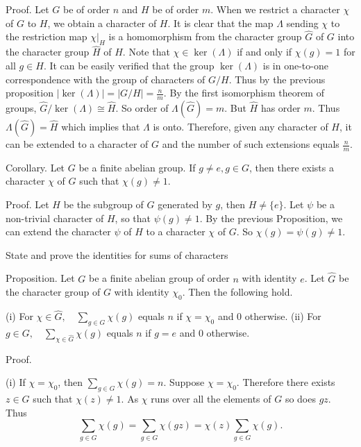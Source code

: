 Proof. Let \( G \) be of order \( n \) and \( H \) be of order \( m \). When we restrict a character \( \chi \) of \( G \) to \( H \), 
we obtain a character of \( H \). 
It is clear that the map \( \Lambda \) sending \( \chi \) to the restriction map \( \chi|_H \) is a homomorphism 
from the character group \(\hat{G}\) of \( G \) into the character group \(\hat{H}\) of \( H \). 
Note that \( \chi \in \ker(\Lambda) \) if and only if \( \chi(g) = 1 \) for all \( g \in H \). 
It can be easily verified that the group \(\ker(\Lambda)\) is in one-to-one correspondence with the group of characters of \( G/H \). 
Thus by the previous proposition \(|\ker(\Lambda)| = |G/H| = \frac{n}{m}\). 
By the first isomorphism theorem of groups, \(\hat{G}/\ker(\Lambda) \cong \hat{H}\). 
So order of \(\Lambda(\hat{G}) = m\). But \(\hat{H}\) has order \( m \). Thus \(\Lambda(\hat{G}) = \hat{H}\) which implies that \(\Lambda\) is onto. 
Therefore, given any character of \( H \), it can be extended to a character of \( G \) 
and the number of such extensions equals \(\frac{n}{m}\).

Corollary. Let \( G \) be a finite abelian group. 
If \( g \neq e, g \in G \), then there exists a character \( \chi \) of \( G \) such that \( \chi(g) \neq 1 \).

Proof. Let \( H \) be the subgroup of \( G \) generated by \( g \), then \( H \neq \{e\} \). 
Let \(\psi\) be a non-trivial character of \( H \), so that \(\psi(g) \neq 1\). 
By the previous Proposition, we can extend the character \(\psi\) of \( H \) to a character \(\chi\) of \( G \). 
So \(\chi(g) = \psi(g) \neq 1\).

State and prove the identities for sums of characters

Proposition.
Let \( G \) be a finite abelian group of order \( n \) with identity \( e \). 
Let \(\hat{G}\) be the character group of \( G \) with identity \(\chi_0\). Then the following hold.

(i) For \( \chi \in \hat{G}, \quad \sum_{g \in G} \chi(g) \) equals \( n \) if \( \chi = \chi_0 \) and 0 otherwise.
(ii) For \( g \in G, \quad \sum_{\chi \in \hat{G}} \chi(g) \) equals \( n \) if \( g = e \) and 0 otherwise.

Proof. 

(i) If \( \chi = \chi_0 \), then \(\sum_{g \in G} \chi(g) = n\). Suppose \( \chi = \chi_0 \). Therefore there exists \( z \in G \) such that \( \chi(z) \neq 1 \). As \(\chi\) runs over all the elements of \( G \) so does \( g z \). Thus 
\[
\sum_{g \in G} \chi(g) = \sum_{g \in G} \chi(g z) = \chi(z) \sum_{g \in G} \chi(g).
\]

